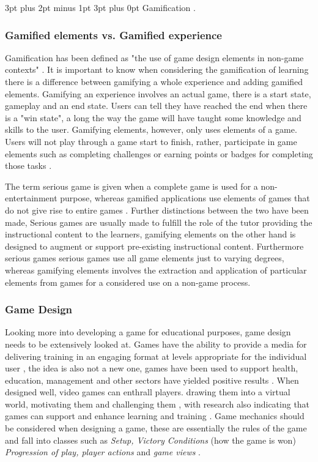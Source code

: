 \documentclass[12pt,a4paper]{article}
\makeatletter
\renewcommand\subsection{\@startsection {subsection}{1}{2mm} %
                               {3pt plus 2pt minus 1pt} %
                               {3pt plus 0pt} %
                               {\normalfont\bfseries}}
\makeatother
\begin{document}
\subsection{Gamification} . 
\subsubsection{Gamified elements vs. Gamified experience}
Gamification has been defined as "the use of game design elements in non-game contexts" \cite{deterding2011gamification}. It is important to know when considering the gamification of learning there is a difference between gamifying a whole experience and adding gamified elements. Gamifying an experience involves an actual game, there is a start state, gameplay and an end state. Users can tell they have reached the end when there is a "win state", a long the way the game will have taught some knowledge and skills to the user. Gamifying elements, however, only uses elements of a game. Users will not play through a game start to finish, rather, participate in game elements such as completing challenges or earning points or badges for completing those tasks \cite{kapp2012}.  


The term serious game is given when a complete game is used for a non-entertainment purpose, whereas gamified applications use elements of games that do not give rise to entire games \cite{deterding2011gamification}. Further distinctions between the two have been made, Serious games are usually made to fulfill the role of the tutor providing the instructional content to the learners, gamifying elements on the other hand is designed to augment or support pre-existing instructional content. Furthermore serious games serious games use all game elements just to varying degrees, whereas gamifying elements
involves the extraction and application of particular elements from games for a considered use on a non-game process\cite{landers2014developing}.  

\subsubsection{Game Design} 
Looking more into developing a game for educational purposes, game design needs to be extensively looked at. Games have the ability to provide a media for delivering training in an engaging format at levels appropriate for the individual user \cite{nagarajan2012exploring1}, the idea is also not a new one, games have been used to support health, education, management and other sectors have yielded positive results \cite{prensky2003digital}. When designed well, video games can enthrall players. drawing them into a virtual world, motivating them and challenging them \cite{nagarajan2012exploring2}, with research also indicating that games can support and enhance learning and training \cite{cone2007video}. Game mechanics should be considered when designing a game, these are essentially the rules of the game and fall into classes such as \emph{Setup, Victory Conditions} (how the game is won) \emph{Progression of play, player actions} and  \emph{game views} \cite{nagarajan2012exploring4}.
\end{document}
